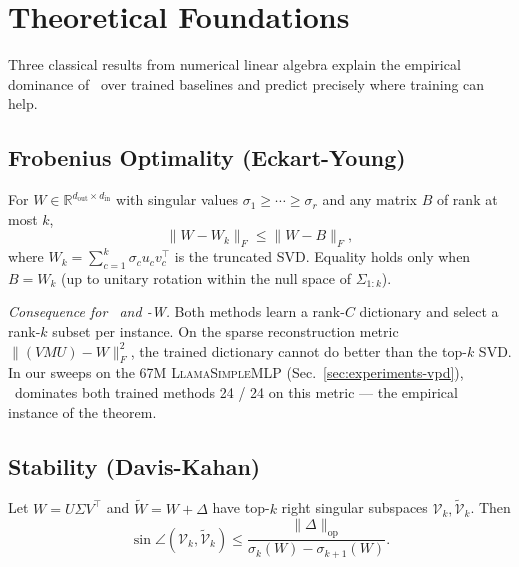 \section{Theoretical Foundations}
\label{sec:theory}

Three classical results from numerical linear algebra explain the empirical dominance of \svdomp\ over trained baselines and predict precisely where training can help.

\subsection{Frobenius Optimality (Eckart-Young)}

\begin{theorem}
For $W \in \mathbb{R}^{d_\text{out} \times d_\text{in}}$ with singular values $\sigma_1 \geq \cdots \geq \sigma_r$ and any matrix $B$ of rank at most $k$,
\begin{equation}
\|W - W_k\|_F \leq \|W - B\|_F,
\end{equation}
where $W_k = \sum_{c=1}^k \sigma_c u_c v_c^\top$ is the truncated SVD. Equality holds only when $B = W_k$ (up to unitary rotation within the null space of $\Sigma_{1:k}$).
\end{theorem}

\emph{Consequence for \vpd\ and \bsf-W.} Both methods learn a rank-$C$ dictionary and select a rank-$k$ subset per instance. On the sparse reconstruction metric $\|(V M U) - W\|_F^2$, the trained dictionary cannot do better than the top-$k$ SVD. In our sweeps on the 67M \textsc{LlamaSimpleMLP} (Sec.\ \ref{sec:experiments-vpd}), \svdomp\ dominates both trained methods 24 / 24 on this metric --- the empirical instance of the theorem.

\subsection{Stability (Davis-Kahan)}

\begin{theorem}
Let $W = U \Sigma V^\top$ and $\tilde{W} = W + \Delta$ have top-$k$ right singular subspaces $\mathcal{V}_k, \tilde{\mathcal{V}}_k$. Then
\begin{equation}
\sin \angle(\mathcal{V}_k, \tilde{\mathcal{V}}_k) \leq \frac{\|\Delta\|_\text{op}}{\sigma_k(W) - \sigma_{k+1}(W)}.
\end{equation}
\end{theorem}

